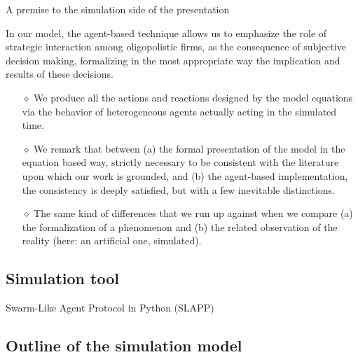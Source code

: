 \documentclass[9pt]{beamer}
\begin{document}
\begin{frame}{A premise to the simulation side of the presentation}

In our model, the agent-based technique allows us to emphasize the role of strategic interaction among oligopolistic firms, as the consequence of subjective decision making, formalizing in the most appropriate way the implication and results of these decisions. 

\begin{itemize}

\item[$\diamond$] We produce all the actions and reactions designed by the model equations via the behavior of heterogeneous agents actually acting in the simulated time. 

\item[$\diamond$] We remark that between (a) the formal presentation of the model in the equation based way, strictly necessary to be consistent with the literature upon which our work is grounded, and (b) the agent-based implementation, the consistency is deeply satisfied, but with a few inevitable distinctions. 

\item[$\diamond$] The same kind of differences that we run up against when we compare (a) the formalization of a phenomenon and (b) the related observation of the reality (here: an artificial one, simulated).

\end{itemize}

\end{frame}

\subsection{Simulation tool}

\begin{frame}{Swarm-Like Agent Protocol in Python (SLAPP)}

\end{frame}

\subsection{Outline of the simulation model}
\end{document}
